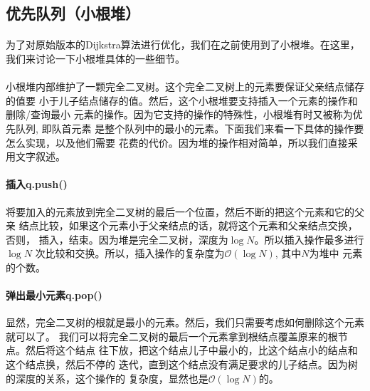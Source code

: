 \documentclass{article}
\begin{document}
	\subsection{优先队列（小根堆）}
		\paragraph{}
			为了对原始版本的Dijkstra算法进行优化，我们在之前使用到了小根堆。在这里，
			我们来讨论一下小根堆具体的一些细节。
		\paragraph{}
			小根堆内部维护了一颗完全二叉树。这个完全二叉树上的元素要保证父亲结点储存的值要
			小于儿子结点储存的值。然后，这个小根堆要支持插入一个元素的操作和删除/查询最小
			元素的操作。因为它支持的操作的特殊性，小根堆有时又被称为优先队列, 即队首元素
			是整个队列中的最小的元素。下面我们来看一下具体的操作要怎么实现，以及他们需要
			花费的代价。因为堆的操作相对简单，所以我们直接采用文字叙述。
		\paragraph{插入q.push()}
			将要加入的元素放到完全二叉树的最后一个位置，然后不断的把这个元素和它的父亲
			结点比较，如果这个元素小于父亲结点的话，就将这个元素和父亲结点交换，否则，
			插入，结束。因为堆是完全二叉树，深度为$\log N$。所以插入操作最多进行$\log N$
			次比较和交换。所以，插入操作的复杂度为$\mathcal{O}(\log N)$, 其中$N$为堆中
			元素的个数。
		\paragraph{弹出最小元素q.pop()}
			显然，完全二叉树的根就是最小的元素。然后，我们只需要考虑如何删除这个元素就可以了。
			我们可以将完全二叉树的最后一个元素拿到根结点覆盖原来的根节点。然后将这个结点
			往下放，把这个结点儿子中最小的，比这个结点小的结点和这个结点换，然后不停的
			迭代，直到这个结点没有满足要求的儿子结点。因为树的深度的关系，这个操作的
			复杂度，显然也是$\mathcal{O}(\log N)$的。
\end{document}
